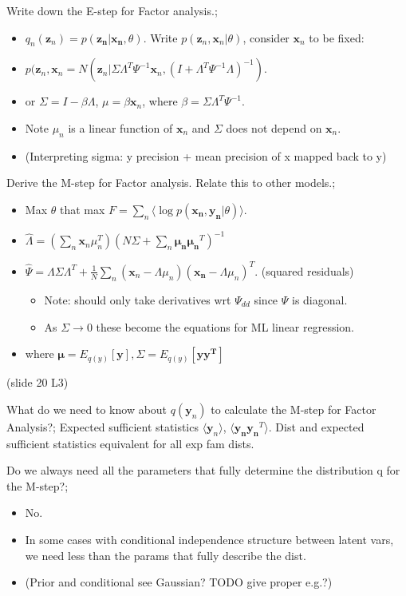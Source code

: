 \documentclass{article}
\begin{document}
Write down the E-step for Factor analysis.; \begin{itemize} \item $q_n(\mathbf{z}_n) = p(\mathbf{z_n|x_n}, \theta)$. Write $p(\mathbf{z}_n, \mathbf{x}_n|\theta)$, consider $\mathbf{x}_n$ to be fixed: \item $p(\mathbf{z}_n, \mathbf{x}_n = N(\mathbf{z}_n | \Sigma\Lambda^T\Psi^{-1}\mathbf{x}_n, (I+\Lambda^T\Psi^{-1}\Lambda)^{-1})$.  \item or $\Sigma = I - \beta\Lambda$, $\mu = \beta\mathbf{x}_n$, where $\beta=\Sigma\Lambda^T\Psi^{-1}$.  \item Note $\mu_n$ is a linear function of $\mathbf{x}_n$ and $\Sigma$ does not depend on $\mathbf{x}_n$.  \item (Interpreting sigma: y precision + mean precision of x mapped back to y) \end{itemize}

Derive the M-step for Factor analysis. Relate this to other models.; \begin{itemize} \item Max $\theta$ that max $F=\sum_n \langle \log p(\mathbf{x_n, y_n}|\theta) \rangle$.  \item $\hat\Lambda = (\sum_n \mathbf{x}_n\mu_n^T)(N\Sigma+\sum_n\mathbf{\mu_n\mu_n}^T)^{-1}$ \item $\hat{\Psi} = \Lambda\Sigma\Lambda^T + \frac{1}{N}\sum_n(\mathbf{x}_n-\Lambda\mu_n)(\mathbf{x_n}-\Lambda\mu_n)^T$. (squared residuals)\begin{itemize} \item Note: should only take derivatives wrt $\Psi_{dd}$ since $\Psi$ is diagonal.  \item As $\Sigma\rightarrow 0$ these become the equations for ML linear regression.  \end{itemize} \item where $\mathbf{\mu} = E_{q(y)}[\mathbf{y}], \Sigma=E_{q(y)}[\mathbf{yy^T}]$\end{itemize} (slide 20 L3)

What do we need to know about $q(\mathbf{y}_n)$ to calculate the M-step for Factor Analysis?; Expected sufficient statistics $\langle \mathbf{y}_n \rangle$, $\langle \mathbf{y_ny_n}^T \rangle$. Dist and expected sufficient statistics equivalent for all exp fam dists.

Do we always need all the parameters that fully determine the distribution q for the M-step?; \begin{itemize} \item No.  \item In some cases with conditional independence structure between latent vars, we need less than the params that fully describe the dist.  \item (Prior and conditional see Gaussian? TODO give proper e.g.?) \end{itemize}
\end{document}
